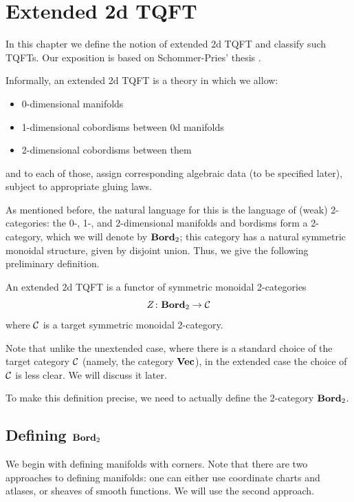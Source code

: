 \chapter{Extended 2d TQFT}\label{c:2d-extended}

In this chapter we define the notion of extended 2d TQFT and classify such
TQFTs. Our exposition is based on Schommer-Pries' thesis .


Informally, an extended 2d TQFT is a theory in which we allow:
\begin{itemize}
  \item 0-dimensional manifolds
  \item 1-dimensional cobordisms between 0d manifolds
  \item 2-dimensional cobordisms between them
\end{itemize}
and to each of those, assign corresponding algebraic data (to be
specified later), subject to appropriate gluing laws.

As mentioned before, the natural language for this is the language of (weak)
2-categories: the 0-, 1-, and 2-dimensional manifolds and bordisms form a
2-category, which we will denote by $\mathbf{Bord}_2$; this category has a natural
symmetric monoidal structure, given by disjoint union. Thus, we give the
following preliminary definition.

\begin{predefinition}
  An extended 2d TQFT is a functor of symmetric monoidal 2-categories
  $$
    Z\colon \mathbf{Bord}_2\to \mathcal{C}
  $$
  where $\mathcal{C}$ is a target symmetric monoidal 2-category.
\end{predefinition}
Note that unlike the unextended case, where there is a standard choice of
the target category $\mathcal{C}$ (namely, the category $\mathbf{Vec}$), in the extended case
the choice of $\mathcal{C}$ is less clear. We will discuss it later.

To make this definition precise, we need to actually define the
2-category $\mathbf{Bord}_2$.

\section{Defining $\mathbf{Bord}_2$}\label{s:defining-bord2}
We begin with defining manifolds with corners. Note that there are two
approaches to defining manifolds: one can either use coordinate charts and
atlases, or sheaves of smooth functions. We will use the second approach.

